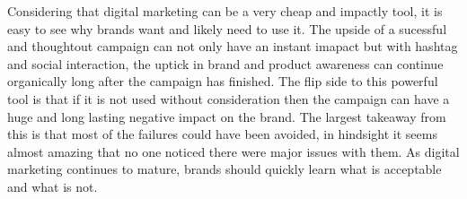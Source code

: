 \documentclass{article}
\begin{document}
Considering that digital marketing can be a very cheap and impactly tool, it is easy to see why brands want and likely need to use it. The upside of a sucessful and thoughtout campaign can not only have an instant imapact but with hashtag and social interaction, the uptick in brand and product awareness can continue organically long after the campaign has finished. The flip side to this powerful tool is that if it is not used without consideration then the campaign can have a huge and long lasting negative impact on the brand. 
The largest takeaway from this is that most of the failures could have been avoided, in hindsight it seems almost amazing that no one noticed there were major issues with them. As digital marketing continues to mature, brands should quickly learn what is acceptable and what is not.



\end{document}
